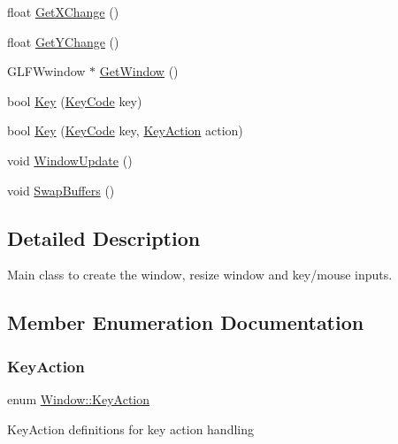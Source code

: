 \begin{DoxyCompactItemize}
\item 
float \mbox{\hyperlink{class_window_a777dd058c4e998417c9b374525ea1a1c}{Get\+X\+Change}} ()
\item 
float \mbox{\hyperlink{class_window_a632bb091879d4541c9227ed1fd05136b}{Get\+Y\+Change}} ()
\item 
G\+L\+F\+Wwindow $\ast$ \mbox{\hyperlink{class_window_a2213a66f028c29a8247d1a1ae8a0517e}{Get\+Window}} ()
\item 
bool \mbox{\hyperlink{class_window_a204179a76d0a02a336fde32a1da32186}{Key}} (\mbox{\hyperlink{class_window_a4915898e3e02586ae359c8cfb9114717}{Key\+Code}} key)
\item 
bool \mbox{\hyperlink{class_window_a22723619109b05b9a6955359a4ab7267}{Key}} (\mbox{\hyperlink{class_window_a4915898e3e02586ae359c8cfb9114717}{Key\+Code}} key, \mbox{\hyperlink{class_window_ab44a7b55f0ce55c37d361fc51b302bdb}{Key\+Action}} action)
\item 
void \mbox{\hyperlink{class_window_abbe71691ebdc8d45fff39f53f0b077a7}{Window\+Update}} ()
\item 
void \mbox{\hyperlink{class_window_abe1b83eda6980f2b9964aab08b5310ed}{Swap\+Buffers}} ()
\end{DoxyCompactItemize}


\subsection{Detailed Description}
Main class to create the window, resize window and key/mouse inputs. 

\subsection{Member Enumeration Documentation}
\mbox{\label{class_window_ab44a7b55f0ce55c37d361fc51b302bdb}} 
\subsubsection{\texorpdfstring{KeyAction}{KeyAction}}
{\footnotesize\ttfamily enum \mbox{\hyperlink{class_window_ab44a7b55f0ce55c37d361fc51b302bdb}{Window\+::\+Key\+Action}}}

Key\+Action definitions for key action handling \mbox{\label{class_window_a4915898e3e02586ae359c8cfb9114717}} 
